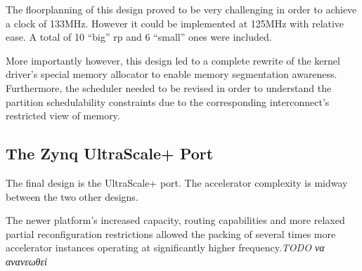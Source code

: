 The floorplanning of this design proved to be very challenging in order to achieve a clock of 133MHz.
However it could be implemented at 125MHz with relative ease. A total of 10 ``big'' \gls{rp} and
6 ``small'' ones were included.

More importantly however, this design led to a complete rewrite of the kernel driver's special memory allocator
to enable memory segmentation awareness. Furthermore, the scheduler needed to be revised in order to understand
the partition schedulability constraints due to the corresponding interconnect's restricted view of memory.


\subsection{The Zynq UltraScale+ Port}

The final design is the UltraScale+ port.
The accelerator complexity is midway between the two other designs.

The newer platform's increased capacity, routing capabilities
and more relaxed partial reconfiguration restrictions
allowed the packing of several times more accelerator instances
operating at significantly higher frequency.\emph{TODO να ανανεωθεί}


